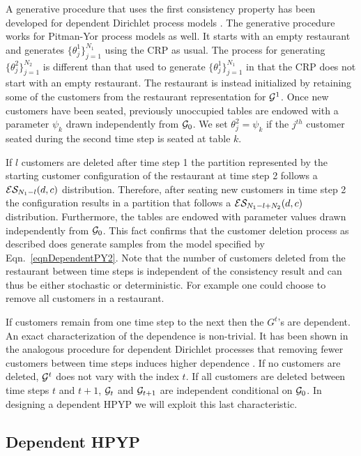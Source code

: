 A generative procedure that uses the first consistency property has been developed for dependent Dirichlet process models \cite{Caron2007}.  The generative procedure works for Pitman-Yor process models as well. It starts with an empty restaurant and generates $\{ \theta_j^1\}_{j= 1}^{N_1}$ using the CRP as usual.  The process for generating $\{ \theta_j^2\}_{j= 1}^{N_2}$ is different than that used to generate $\{ \theta_j^1\}_{j= 1}^{N_1}$ in that the CRP does not start with an empty restaurant.  The restaurant is instead initialized by retaining some of the customers from the restaurant representation for $\G^1$.  Once new customers have been seated, previously unoccupied tables are endowed with a parameter $\psi_k$ drawn independently from $\G_0$.  We set $\theta^2_j = \psi_k$ if  the $j^{th}$ customer seated during the second time step is seated at table $k$. 

If $l$ customers are deleted after time step 1 the partition represented by the starting customer configuration of the restaurant at time step 2 follows a $\ES_{N_1- l}(d,c)$ distribution.  Therefore, after seating new customers in time step 2 the configuration results in a partition that follows a $\ES_{N_1 - l + N_2}(d,c)$ distribution. Furthermore, the tables are endowed with parameter values drawn independently from $\G_0$.  This fact confirms that the customer deletion process as described does generate samples from the model specified by Eqn.~\ref{eqnDependentPY2}. Note that the number of customers deleted from the restaurant between time steps is independent of the consistency result and can thus be either stochastic or deterministic. For example one could choose to remove all customers in a restaurant.

If customers remain from one time step to the next then the $G^t$'s are dependent.  An exact characterization of the dependence is non-trivial.   It has been shown in the analogous procedure for dependent Dirichlet processes that removing fewer customers between time steps induces higher dependence \cite{Caron2007}.  If no customers are deleted, $\G^t$ does not vary with the index $t$.  If all customers are deleted between time steps $t$ and $t+1$,  $\G_t$ and $\G_{t+1}$ are independent conditional on $\G_0$.  In designing a dependent HPYP we will exploit this last characteristic.

\subsection{Dependent HPYP}
\label{sec:dhpyp}

